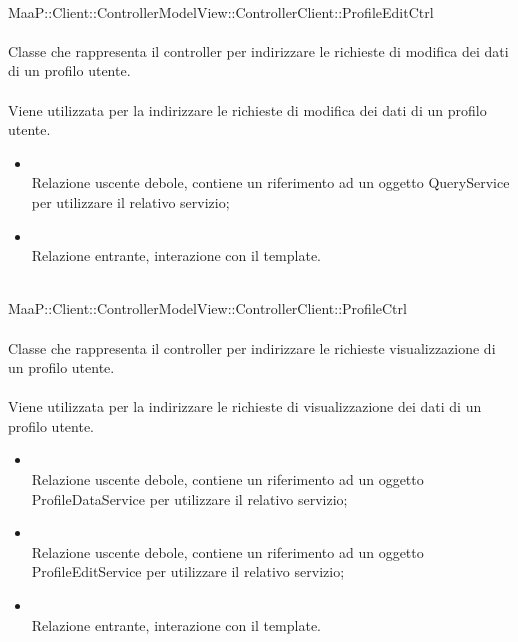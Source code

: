 \\
MaaP::Client::ControllerModelView::ControllerClient::ProfileEditCtrl\\
\\
Classe che rappresenta il controller per indirizzare le richieste di modifica dei dati di un profilo utente.\\
\\
Viene utilizzata per la indirizzare le richieste di modifica dei dati di un profilo utente.\\
\begin{itemize}
\item{}\\
Relazione uscente debole, contiene un riferimento ad un oggetto QueryService per utilizzare il relativo servizio;
\item{}\\
Relazione entrante, interazione con il template.
\end{itemize}

\\
MaaP::Client::ControllerModelView::ControllerClient::ProfileCtrl\\
\\
Classe che rappresenta il controller per indirizzare le richieste visualizzazione di un profilo utente.\\
\\
Viene utilizzata per la indirizzare le richieste di visualizzazione dei dati di un profilo utente.\\
\begin{itemize}
\item{}\\
Relazione uscente debole, contiene un riferimento ad un oggetto ProfileDataService per utilizzare il relativo servizio;
\item{}\\
Relazione uscente debole, contiene un riferimento ad un oggetto ProfileEditService per utilizzare il relativo servizio;
\item{}\\
Relazione entrante, interazione con il template.
\end{itemize}


